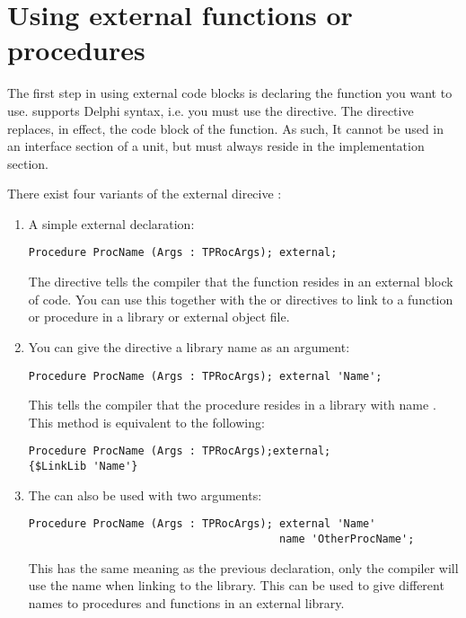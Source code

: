 \documentclass{report}
\begin{document}
\section{Using external functions or procedures}
\label{se:ExternalFunction}

The first step in using external code blocks is declaring the function you
want to use. \fpc supports Delphi syntax, i.e. you must use the
 directive. The  directive replaces, in effect,
the code block of the function. As such, It cannot be used in an interface
section of a unit, but must always reside in the implementation section.

There exist four variants of the external direcive :
\begin{enumerate}
\item A simple external declaration:
\begin{verbatim}
Procedure ProcName (Args : TPRocArgs); external;
\end{verbatim}
The  directive tells the compiler that the function resides in
an external block of code. You can use this together with the 
or  directives to link to a function or procedure in a
library or external object file.

\item You can give the  directive a library name as an
argument:
\begin{verbatim}
Procedure ProcName (Args : TPRocArgs); external 'Name';
\end{verbatim}
This tells the compiler that the procedure resides in a library with name
. This method is equivalent to the following:
\begin{verbatim}
Procedure ProcName (Args : TPRocArgs);external;
{$LinkLib 'Name'}
\end{verbatim}
\item The  can also be used with two arguments:
\begin{verbatim}
Procedure ProcName (Args : TPRocArgs); external 'Name'
                                       name 'OtherProcName';
\end{verbatim}
This has the same meaning as the previous declaration, only the compiler
will use the name  when linking to the library. This
can be used to give different names to procedures and functions in an
external library.


\end{enumerate}
\end{document}
